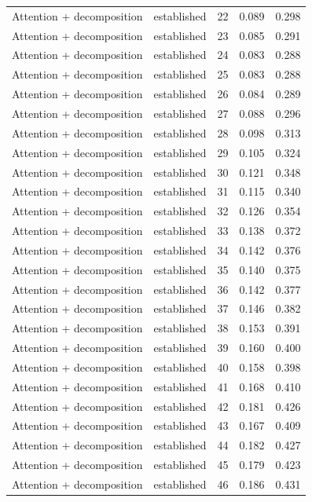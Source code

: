 \begin{tabular}{llrrr}
Attention + decomposition & established & 22 & 0.089 & 0.298 \\
Attention + decomposition & established & 23 & 0.085 & 0.291 \\
Attention + decomposition & established & 24 & 0.083 & 0.288 \\
Attention + decomposition & established & 25 & 0.083 & 0.288 \\
Attention + decomposition & established & 26 & 0.084 & 0.289 \\
Attention + decomposition & established & 27 & 0.088 & 0.296 \\
Attention + decomposition & established & 28 & 0.098 & 0.313 \\
Attention + decomposition & established & 29 & 0.105 & 0.324 \\
Attention + decomposition & established & 30 & 0.121 & 0.348 \\
Attention + decomposition & established & 31 & 0.115 & 0.340 \\
Attention + decomposition & established & 32 & 0.126 & 0.354 \\
Attention + decomposition & established & 33 & 0.138 & 0.372 \\
Attention + decomposition & established & 34 & 0.142 & 0.376 \\
Attention + decomposition & established & 35 & 0.140 & 0.375 \\
Attention + decomposition & established & 36 & 0.142 & 0.377 \\
Attention + decomposition & established & 37 & 0.146 & 0.382 \\
Attention + decomposition & established & 38 & 0.153 & 0.391 \\
Attention + decomposition & established & 39 & 0.160 & 0.400 \\
Attention + decomposition & established & 40 & 0.158 & 0.398 \\
Attention + decomposition & established & 41 & 0.168 & 0.410 \\
Attention + decomposition & established & 42 & 0.181 & 0.426 \\
Attention + decomposition & established & 43 & 0.167 & 0.409 \\
Attention + decomposition & established & 44 & 0.182 & 0.427 \\
Attention + decomposition & established & 45 & 0.179 & 0.423 \\
Attention + decomposition & established & 46 & 0.186 & 0.431 \\

\end{tabular}
